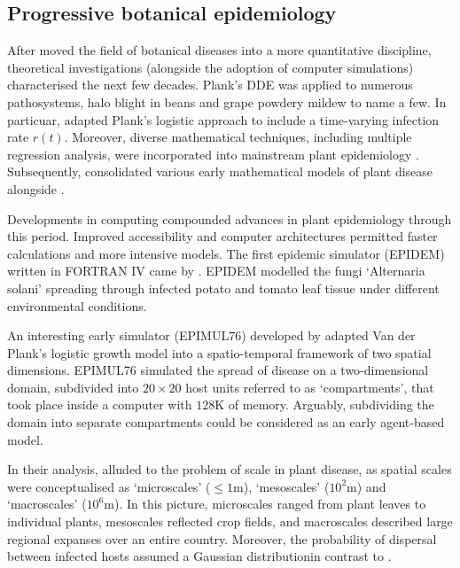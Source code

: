 \subsection{Progressive botanical epidemiology}

After \cite{van2013plant} moved the field of botanical diseases into a more quantitative discipline,
theoretical investigations (alongside the adoption of computer simulations) characterised the next few decades.
Plank's DDE was applied to numerous pathosystems, halo blight in beans \cite{doi:10.1111/j.1744-7348.1979.tb06527.x} 
and grape powdery mildew \cite{sall1980epidemiology} to name a few. In particuar, \cite{sall1980epidemiology} adapted Plank's
logistic approach to include a time-varying infection rate $r(t)$. Moreover, diverse mathematical techniques, 
including multiple  regression analysis, were incorporated into mainstream plant epidemiology \cite{butt1974multiple}. 
Subsequently, \cite{zadoks1979epidemiology} consolidated various early mathematical models of plant disease 
alongside \cite{jeger1984use}.

Developments in computing compounded advances in plant epidemiology through this period. 
Improved accessibility and computer architectures permitted faster calculations and more intensive models. 
The first epidemic simulator (EPIDEM) written in FORTRAN IV came by \cite{waggoner1969epidem}. 
EPIDEM modelled the fungi `Alternaria solani' spreading through infected potato and tomato leaf tissue under different environmental conditions. 
    
An interesting early simulator (EPIMUL76) developed by \cite{zadoks1977role} adapted Van der Plank's logistic growth model into a spatio-temporal framework of two spatial dimensions. 
EPIMUL76 simulated the spread of disease on a two-dimensional domain, subdivided into $20\times 20$ host units referred to as `compartments', that took place inside a computer with $128\mathrm{K}$ of memory.
Arguably, subdividing the domain into separate compartments could be considered as an early agent-based model. 

In their analysis, \cite{zadoks1977role} alluded to the problem of scale in plant disease, as spatial scales
were conceptualised as `microscales' ($\leq 1\mathrm{m}$), `mesoscales' ($10^2\mathrm{m}$) and `macroscales' ($10^6\mathrm{m}$).
In this picture, microscales ranged from plant leaves to individual plants, mesoscales reflected crop fields, and macroscales
described large regional expanses over an entire country. Moreover, the probability of dispersal between infected hosts assumed a
Gaussian distribution\textemdash in contrast to \cite{doi:10.1146/annurev.py.06.090168.001201}.

